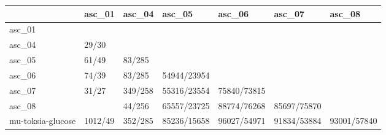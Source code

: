 \begin{tabular}{lllllll}
\toprule
{} &   asc\_01 &   asc\_04 &       asc\_05 &       asc\_06 &       asc\_07 &       asc\_08 \\
\midrule
asc\_01            &          &          &              &              &              &              \\
asc\_04            &    29/30 &          &              &              &              &              \\
asc\_05            &    61/49 &   83/285 &              &              &              &              \\
asc\_06            &    74/39 &   83/285 &  54944/23954 &              &              &              \\
asc\_07            &    31/27 &  349/258 &  55316/23554 &  75840/73815 &              &              \\
asc\_08            &          &   44/256 &  65557/23725 &  88774/76268 &  85697/75870 &              \\
mu-toksia-glucose &  1012/49 &  352/285 &  85236/15658 &  96027/54971 &  91834/53884 &  93001/57840 \\
\bottomrule
\end{tabular}
